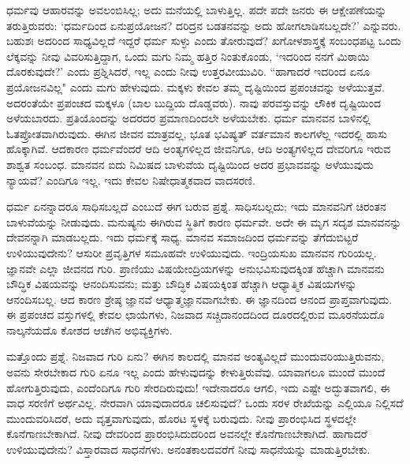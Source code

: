 ಧರ್ಮವು ಆಹಾರವನ್ನು ಅವಲಂಬಿಸಿಲ್ಲ; ಅದು ಮನೆಯಲ್ಲಿ ಬಾಳುತ್ತಿಲ್ಲ. ಪದೇ ಪದೇ ಜನರು ಈ ಆಕ್ಷೇಪಣೆಯನ್ನು ತರುತ್ತಿರುವರು: `ಧರ್ಮದಿಂದ ಏನು\break ಪ್ರಯೋಜನ? ದರಿದ್ರನ ಬಡತನವನ್ನು ಅದು ಹೋಗಲಾಡಿಸಬಲ್ಲದೇ?' ಎನ್ನುವರು. ಬಹುಶಃ ಅದರಿಂದ ಸಾಧ್ಯವಿಲ್ಲದೆ ಇದ್ದರೆ ಧರ್ಮ ಸುಳ್ಳು ಎಂದು ತೋರುವುದೆ? ಖಗೋಳಶಾಸ್ತ್ರಕ್ಕೆ ಸಂಬಂಧಪಟ್ಟ ಒಂದು ಲೆಕ್ಕವನ್ನು ನೀವು ವಿವರಿಸುತ್ತಿದ್ದಾಗ, ಒಂದು ಮಗು ನಿಮ್ಮ ಹತ್ತಿರ ನಿಂತುಕೊಂಡು, `ಇದರಿಂದ ನನಗೆ ಮಿಠಾಯಿ ದೊರಕುವುದೇ?' ಎಂದು ಪ್ರಶ್ನಿಸಿದರೆ, ಇಲ್ಲ ಎಂದು ನೀವು ಉತ್ತರವೀಯುವಿರಿ. “ಹಾಗಾದರೆ ಇದರಿಂದ ಏನೂ ಪ್ರಯೋಜನವಿಲ್ಲ" ಎಂದು ಮಗು ಹೇಳುವುದು. ಮಕ್ಕಳು ಕೇವಲ ತಮ್ಮ ದೃಷ್ಟಿಯಿಂದ ಪ್ರಪಂಚವನ್ನು ಅಳೆಯುತ್ತವೆ. ಅದರಂತೆಯೇ ಪ್ರಪಂಚದ ಮಕ್ಕಳೂ (ಬಾಲ ಬುದ್ದಿಯ ದೊಡ್ಡವರು). ನಾವು ಪರವಸ್ತುವನ್ನು ಲೌಕಿಕ ದೃಷ್ಟಿಯಿಂದ ಅಳೆಯಬಾರದು. ಪ್ರತಿಯೊಂದನ್ನು ಅದರದರ ಪ್ರಮಾಣದಿಂದಲೇ ಅಳೆಯಬೇಕು. ಧರ್ಮ ಮಾನವನ ಬಾಳಿನಲ್ಲಿ ಓತಪ್ರೋತವಾಗಿರುವುದು. ಈಗಿನ ಜೀವನ ಮಾತ್ರವಲ್ಲ, ಭೂತ ಭವಿಷ್ಯತ್ ವರ್ತಮಾನ ಕಾಲಗಳೆಲ್ಲ ಇದರಲ್ಲಿ ಹಾಸು ಹೊಕ್ಕಾಗಿವೆ. ಆದಕಾರಣ ಧರ್ಮವೆಂದರೆ ಆದಿ ಅಂತ್ಯಗಳಿಲ್ಲದ ಜೀವನಿಗೂ, ಆದಿ ಅಂತ್ಯಗಳಿಲ್ಲದ ದೇವರಿಗೂ ಇರುವ ಶಾಶ್ವತ ಸಂಬಂಧ. ಮಾನವನ ಐದು ನಿಮಿಷದ ಬಾಳುವೆಯ ದೃಷ್ಟಿಯಿಂದ ಅದರ ಪ್ರಭಾವವನ್ನು ಅಳೆಯುವುದು ನ್ಯಾಯವೆ? ಎಂದಿಗೂ ಇಲ್ಲ. ಇದು ಕೇವಲ ನಿಷೇಧಾತ್ಮಕವಾದ ವಾದಸರಣಿ.

ಧರ್ಮ ಏನನ್ನಾದರೂ ಸಾಧಿಸಬಲ್ಲದೆ ಎಂಬುದೆ ಈಗ ಬರುವ ಪ್ರಶ್ನೆ. ಸಾಧಿಸಬಲ್ಲದು; ಇದು ಮಾನವನಿಗೆ ಚಿರಂತನ ಬಾಳುವೆಯನ್ನು ನೀಡುವುದು. ಮನುಷ್ಯನು ಈಗಿರುವ ಸ್ಥಿತಿಗೆ ಕಾರಣ ಧರ್ಮವೇ. ಅದೇ ಈ ಮೃಗ ಸದೃಶ ಮಾನವನನ್ನು ದೇವನನ್ನಾಗಿ ಮಾಡಬಲ್ಲದು. ಇದು ಧರ್ಮಕ್ಕೆ ಸಾಧ್ಯ. ಮಾನವ ಸಮಾಜದಿಂದ ಧರ್ಮವನ್ನು ತೆಗೆದುಬಿಟ್ಟರೆ ಉಳಿಯುವುದೇನು? ಆಸುರೀ ಪ್ರವೃತ್ತಿಗಳ ಸಮೂಹವೇ ಉಳಿಯುವುದು. ಇಂದ್ರಿಯಸುಖ ಮಾನವನ ಗುರಿಯಲ್ಲ. ಜ್ಞಾನವೇ ಎಲ್ಲಾ ಜೀವನದ ಗುರಿ. ಪ್ರಾಣಿಯು ವಿಷಯೇಂದ್ರಿಯಗಳನ್ನು ಅನುಭವಿಸುವುದಕ್ಕಿಂತ ಹೆಚ್ಚಾಗಿ ಮಾನವನು ಬೌದ್ಧಿಕ ವಿಷಯವನ್ನು ಆನಂದಿಸುವನು; ಮತ್ತು ಬೌದ್ಧಿಕ ವಿಷಯಕ್ಕಿಂತ ಹೆಚ್ಚಾಗಿ ಆಧ್ಯಾತ್ಮಿಕ ವಿಷಯಗಳನ್ನು ಆನಂದಿಸಬಲ್ಲ. ಆದ ಕಾರಣ ಶ್ರೇಷ್ಠ ಜ್ಞಾನವೆ ಆಧ್ಯಾತ್ಮಜ್ಞಾನವಾಗಬೇಕು. ಈ ಜ್ಞಾನದಿಂದ ಆನಂದ ಪ್ರಾಪ್ತವಾಗುವುದು. ಈ ಪ್ರಪಂಚದ ವಸ್ತುಗಳಲ್ಲಿ ಕೇವಲ ಛಾಯೆಗಳು, ನಿಜವಾದ ಸಚ್ಚಿದಾನಂದದಿಂದ ದೂರದಲ್ಲಿರುವ ಮೂರನೆಯದೊ ನಾಲ್ಕನೆಯದೊ ಕೋಶದ ಆಚೆಗಿನ ಅಭಿವ್ಯಕ್ತಿಗಳು.

ಮತ್ತೊಂದು ಪ್ರಶ್ನೆ. ನಿಜವಾದ ಗುರಿ ಏನು? ಈಗಿನ ಕಾಲದಲ್ಲಿ ಮಾನವ ಅಂತ್ಯವಿಲ್ಲದೆ ಮುಂದುವರಿಯುತ್ತಿರುವನು, ಅವನು ಸೇರಬೇಕಾದ ಗುರಿ ಏನೂ ಇಲ್ಲ ಎಂದು ಹೇಳುವುದನ್ನು ಕೇಳುತ್ತಿರುವೆವು. ಯಾವಾಗಲೂ ಮುಂದೆ ಮುಂದೆ ಹೋಗುತ್ತಿರುವುದು, ಎಂದೆಂದಿಗೂ ಗುರಿ ಸೇರದಿರುವುದು! ಇದೇನಾದರೂ ಆಗಲಿ, ಇದು ಎಷ್ಟೇ ಅದ್ಭುತವಾಗಲಿ, ಈ ವಾಧ ಸರಣಿಗೆ ಅರ್ಥವಿಲ್ಲ. ನೇರವಾಗಿ ಯಾವುದಾದರೂ ಚಲಿಸುವುದೆ? ಒಂದು ಸರಳ ರೇಖೆಯನ್ನು ಎಲ್ಲಿಯೂ ನಿಲ್ಲಿಸದೆ ಮುಂದುವರಿಸಿದರೆ, ಅದು ವೃತ್ತವಾಗುವುದು, ಹೊರಟ ಸ್ಥಳಕ್ಕೆ ಬರುವುದು. ನೀವು ಪ್ರಾರಂಭಿಸಿದ ಸ್ಥಳದಲ್ಲೇ ಕೊನೆಗಾಣಬೇಕಾಗಿದೆ. ನೀವು ದೇವರಿಂದ ಪ್ರಾರಂಭಿಸಿದುದರಿಂದ ಅವನಲ್ಲೇ ಕೊನೆಗಾಣಬೇಕಾಗಿದೆ. ಹಾಗಾದರೆ ಉಳಿಯುವುದೇನು? ವಿಸ್ತಾರವಾದ ಸಾಧನೆಗಳು. ಅನಂತಕಾಲದವರೆಗೆ ನೀವು ಸಾಧನೆಯನ್ನು ಮಾಡುತ್ತಿರಬೇಕು.

